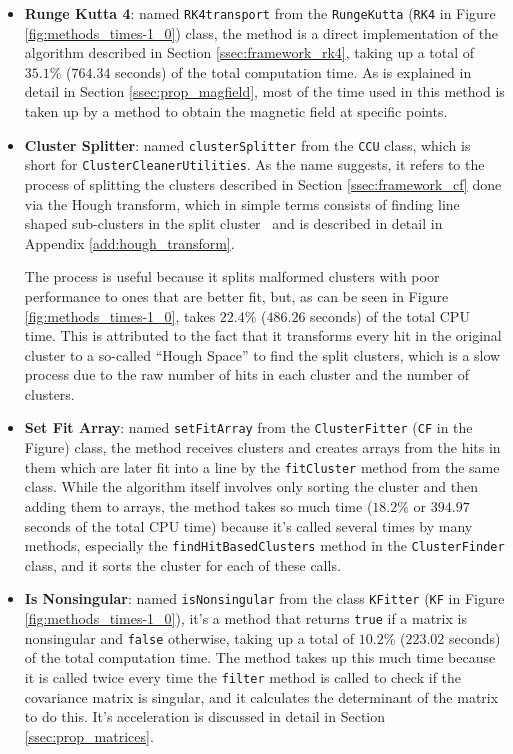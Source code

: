 \begin{itemize}
    \item \textbf{Runge Kutta 4}: named \texttt{RK4transport} from the \texttt{RungeKutta} (\texttt{RK4} in Figure \ref{fig:methods_times-1_0}) class, the method is a direct implementation of the algorithm described in Section \ref{ssec:framework_rk4}, taking up a total of $35.1\%$ ($764.34$ seconds) of the total computation time.
    As is explained in detail in Section \ref{ssec:prop_magfield}, most of the time used in this method is taken up by a method to obtain the magnetic field at specific points.
    
    \item \textbf{Cluster Splitter}: named \texttt{clusterSplitter} from the \texttt{CCU} class, which is short for \texttt{ClusterCleanerUtilities}.
    As the name suggests, it refers to the process of splitting the clusters described in Section \ref{ssec:framework_cf} done via the Hough transform, which in simple terms consists of finding line shaped sub-clusters in the split cluster~\cite{hough1962method} and is described in detail in Appendix \ref{add:hough_transform}.
    
    The process is useful because it splits malformed clusters with poor performance to ones that are better fit, but, as can be seen in Figure \ref{fig:methods_times-1_0}, takes $22.4\%$ ($486.26$ seconds) of the total CPU time.
    This is attributed to the fact that it transforms every hit in the original cluster to a so-called ``Hough Space'' to find the split clusters, which is a slow process due to the raw number of hits in each cluster and the number of clusters.

    \item \textbf{Set Fit Array}: named \texttt{setFitArray} from the \texttt{ClusterFitter} (\texttt{CF} in the Figure) class, the method receives clusters and creates arrays from the hits in them which are later fit into a line by the \texttt{fitCluster} method from the same class.
    While the algorithm itself involves only sorting the cluster and then adding them to arrays, the method takes so much time ($18.2\%$ or $394.97$ seconds of the total CPU time) because it's called several times by many methods, especially the \texttt{findHitBasedClusters} method in the \texttt{ClusterFinder} class, and it sorts the cluster for each of these calls.
    
    \item \textbf{Is Nonsingular}: named \texttt{isNonsingular} from the class \texttt{KFitter} (\texttt{KF} in Figure \ref{fig:methods_times-1_0}), it's a method that returns \texttt{true} if a matrix is nonsingular and \texttt{false} otherwise, taking up a total of $10.2\%$ ($223.02$ seconds) of the total computation time.
    The method takes up this much time because it is called twice every time the \texttt{filter} method is called to check if the covariance matrix is singular, and it calculates the determinant of the matrix to do this.
    It's acceleration is discussed in detail in Section \ref{ssec:prop_matrices}.


\end{itemize}

